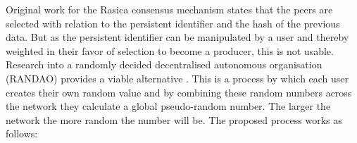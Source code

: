 Original work for the Rasica consensus mechanism states that the peers are selected with relation to the persistent identifier and the hash of the previous data. But as the persistent identifier can be manipulated by a user and thereby weighted in their favor of selection to become a producer, this is not usable. \\

Research into a randomly decided decentralised autonomous organisation (RANDAO) provides a viable alternative \cite{skvorc}\cite{randao}. This is a process by which each user creates their own random value and by combining these random numbers across the network they calculate a global pseudo-random number. The larger the network the more random the number will be. The proposed process works as follows: \\

